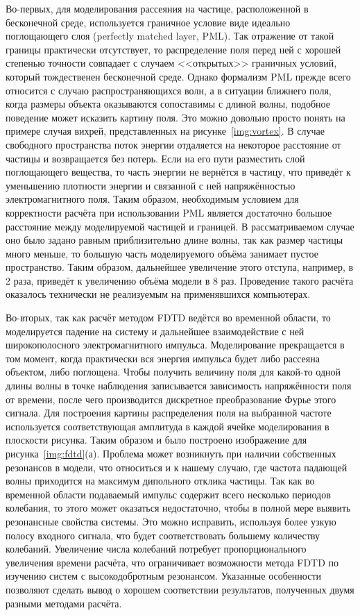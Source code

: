 Во-первых, для моделирования рассеяния на частице, расположенной в
бесконечной среде, используется граничное условие виде идеально
поглощающего слоя (perfectly matched layer, PML). Так отражение от
такой границы практически отсутствует, то распределение поля перед ней
с хорошей степенью точности совпадает с случаем
<<открытых>> граничных условий, который тождественен бесконечной среде.
Однако формализм PML прежде всего относится с случаю
распространяющихся волн, а в ситуации ближнего поля, когда размеры
объекта оказываются сопоставимы с длиной волны, подобное поведение
может исказить картину поля. Это можно довольно просто понять на
примере случая вихрей, представленных на рисунке~\ref{img:vortex}.  В
случае свободного пространства поток энергии отдаляется на некоторое
расстояние от частицы и возвращается без потерь. Если на его пути
разместить слой поглощающего вещества, то часть энергии не вернётся в
частицу, что приведёт к уменьшению плотности энергии и связанной с ней
напряжённостью электромагнитного поля.  Таким образом,
необходимым условием для корректности расчёта при использовании
 PML является достаточно большое расстояние между
моделируемой частицей и границей. В рассматриваемом случае оно было
задано равным приблизительно длине волны, так как размер частицы много
меньше, то большую часть моделируемого объёма занимает пустое
пространство. Таким образом, дальнейшее увеличение этого отступа,
например, в 2 раза, приведёт к увеличению объёма модели в 8
раз. Проведение такого расчёта оказалось технически не реализуемым на
применявшихся компьютерах.

Во-вторых, так как расчёт методом FDTD ведётся во временной области,
то моделируется падение на систему и дальнейшее взаимодействие с ней
широкополосного электромагнитного импульса.  Моделирование
прекращается в том момент, когда практически вся энергия импульса
будет либо рассеяна объектом, либо поглощена.  Чтобы получить величину
поля для какой-то одной длины волны в точке наблюдения записывается
зависимость напряжённости поля от времени, после чего производится
дискретное преобразование Фурье этого сигнала. Для построения
картины распределения поля на выбранной частоте используется
соответствующая амплитуда в каждой ячейке моделирования в
плоскости рисунка. Таким образом и было построено изображение для
рисунка~\ref{img:fdtd}(а). Проблема может возникнуть при наличии
собственных резонансов в модели, что относиться и к нашему случаю, где
частота падающей волны приходится на максимум дипольного отклика
частицы. Так как во временной области подаваемый импульс содержит
всего несколько периодов колебания, то этого может оказаться
недостаточно, чтобы в полной мере выявить резонансные свойства
системы.  Это можно исправить, используя более узкую полосу входного
сигнала, что будет соответствовать большему количеству колебаний.
Увеличение числа колебаний потребует пропорционального
увеличения времени расчёта, что ограничивает возможности метода FDTD
по изучению систем с высокодобротным резонансом. Указанные особенности
позволяют сделать вывод о хорошем соответствии результатов, полученных
двумя разными методами расчёта.


